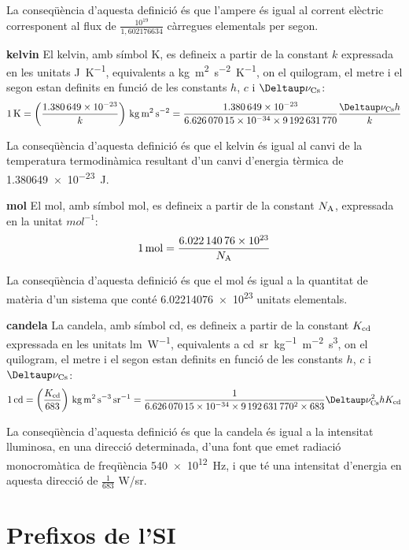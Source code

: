 \begin{list}{}
    La conseqüència d'aquesta definició és que l'ampere és igual al corrent elèctric corresponent al flux de $\frac{10^{19}}{1,602176634}$   càrregues elementals per segon.

   \item[\textbf{kelvin}]  El kelvin, amb símbol K, es defineix a partir de la constant $k$ expressada en les unitats \unit{J.K^{-1}},  equivalents a \unit{kg.m^2.s^{-2}.K^{-1}},  on el quilogram, el metre i el segon estan definits en funció de les constants $h$, $c$ i $\Deltaup\nu\ped{Cs}$:
       \[
            \qty{1}{K} = \left(\frac{\num{1,380649e-23}}{k}\right)\unit{\,kg.m^2.s^{-2}} = \frac{\num{1,380649e-23}}{\num{6,62607015 e-34}\times\num{9192631770}} \frac{\Deltaup\nu\ped{Cs} h}{k}
       \]

    La conseqüència d'aquesta definició és que el kelvin és igual al canvi de la temperatura termodinàmica resultant d'un canvi d'energia tèrmica de \qty{1,380649e-23}{J}.

   \item[\textbf{mol}]  El mol, amb símbol mol, es defineix a partir de la constant $N_\mathrm{A}$, expressada en la unitat  $\unit{mol^{-1}}$:
       \[
            \qty{1}{mol} = \frac{\num{6,02214076 e23}}{N_\mathrm{A}}
       \]

    La conseqüència d'aquesta definició és que el mol és igual a la quantitat de matèria d'un sistema que conté
    \num{6,02214076 e23} unitats elementals.

   \item[\textbf{candela}] La candela, amb símbol cd, es defineix a partir de la constant $K_\mathrm{cd}$ expressada en les unitats \unit{lm.W^{-1}},  equivalents a \unit{cd.sr.kg^{-1}.m^{-2}.s^3},  on el quilogram, el metre i el segon estan definits en funció de les constants $h$, $c$ i $\Deltaup\nu\ped{Cs}$:
       \[
            \qty{1}{cd} = \left(\frac{K\ped{cd}}{683}\right)\unit{\,kg.m^2.s^{-3}.sr^{-1}} = \frac{1}{\num{6,62607015 e-34}\times\num{9192631770}^2\times 683} \Deltaup\nu\ped{Cs}^2 h K\ped{cd}
       \]

    La conseqüència d'aquesta definició és que la candela és igual a la intensitat lluminosa, en una direcció determinada,   d'una font que emet radiació monocromàtica de freqüència \qty{540e12}{Hz}, i
   que té una intensitat d'energia en aquesta direcció de $\frac{1}{683}$ \unit{W/sr}.
\end{list}


\section{Prefixos de l'SI}

